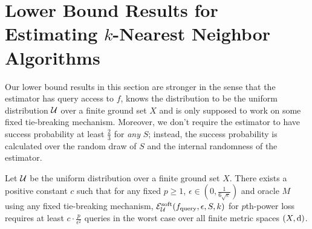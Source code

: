 \section{Lower Bound Results for Estimating $k$-Nearest Neighbor Algorithms}
\label{sec:lower}
Our lower bound results in this section are stronger in the sense that the estimator has query access to $f$, knows the distribution to be the uniform distribution ${\mathcal{U}}$ over a finite ground set $X$ and is only supposed to work on some fixed tie-breaking mechanism. Moreover, we don't require the estimator to have success probability at least $\frac{2}{3}$ for \emph{any} $S$; instead, the success probability is calculated over the random draw of $S$ and the internal randomness of the estimator. 

\begin{theorem}
\label{thm:pthpowerlower}Let ${\mathcal{U}}$ be the uniform distribution over a finite ground set $X$. There exists a positive constant $c$ such that for any fixed $p\geq 1$, $\epsilon\in(0,\frac{1}{6\sqrt{e}})$ and oracle $M$ using any fixed tie-breaking mechanism, $\mathcal{E}^{\mathrm{soft}}_{{\mathcal{U}}}(f_{\mathrm{query}},\epsilon,S,k)$ for $p$th-power loss requires at least $c\cdot\frac{p}{\epsilon^2}$ queries in the worst case over all finite metric spaces $(X,{\mathrm{d}})$.
\end{theorem}






